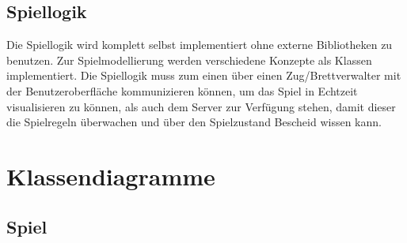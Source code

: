 \documentclass[parskip=full]{scrartcl}
\begin{document}
		\subsection{Spiellogik}
		Die Spiellogik wird komplett selbst implementiert ohne externe Bibliotheken zu benutzen. Zur Spielmodellierung werden verschiedene Konzepte als Klassen implementiert. Die Spiellogik muss zum einen über einen Zug/Brettverwalter mit der Benutzeroberfläche kommunizieren können, um das Spiel in Echtzeit visualisieren zu können, als auch dem Server zur Verfügung stehen, damit dieser die Spielregeln überwachen und über den Spielzustand Bescheid wissen kann.
	\section{Klassendiagramme}
	
		\subsection{Spiel}
		
\end{document}
